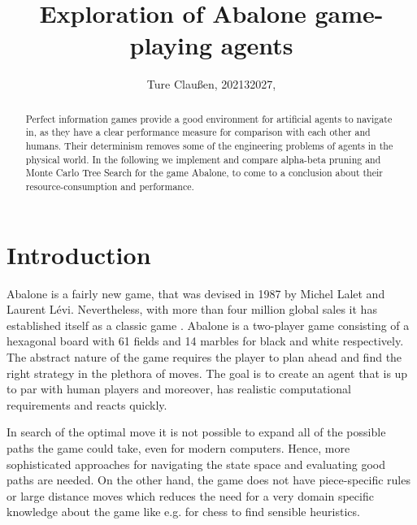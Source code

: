 \documentclass{llncs}
\begin{document}
\title{Exploration of Abalone game-playing agents}
\author{Ture Claußen, 202132027, }

{\def\addcontentsline#1#2#3{}\maketitle} %

\begin{abstract}
  Perfect information games provide a good environment for artificial agents to navigate in, as they have a clear performance measure for comparison with each other and humans. Their determinism removes some of the engineering problems of agents in the physical world. In the following we implement and compare alpha-beta pruning and Monte Carlo Tree Search for the game Abalone, to come to a conclusion about their resource-consumption and performance.
\end{abstract}

\section{Introduction}

Abalone is a fairly new game, that was devised in 1987 by Michel Lalet and Laurent Lévi. Nevertheless, with more than four million global sales it has established itself as a classic game \cite{noauthor_abalone_2020}. Abalone is a two-player game consisting of a hexagonal board with 61 fields and 14 marbles for black and white respectively. The abstract nature of the game requires the player to plan ahead and find the right strategy in the plethora of moves. The goal is to create an agent that is up to par with human players and moreover, has realistic computational requirements and reacts quickly.

In search of the optimal move it is not possible to expand all of the possible paths the game could take, even for modern computers. Hence, more sophisticated approaches for navigating the state space and evaluating good paths are needed. On the other hand, the game does not have piece-specific rules or large distance moves which reduces the need for a very domain specific knowledge about the game like e.g. for chess to find sensible heuristics.
\end{document}
